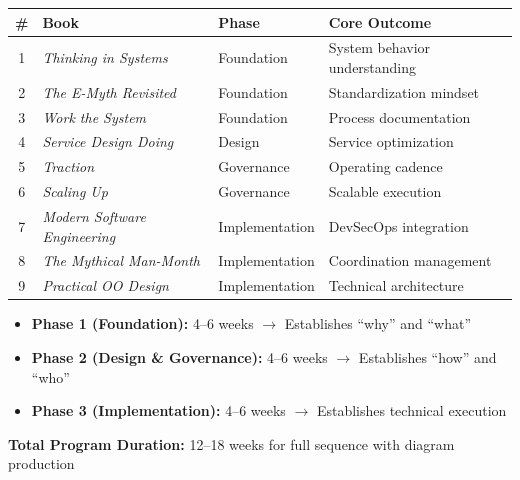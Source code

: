\documentclass[11pt,letterpaper]{article}
\newcommand{\booktitle}[1]{\textit{#1}}
\begin{document}
\begin{center}
\renewcommand{\arraystretch}{1.5}
\begin{tabular}{clll}
\toprule
\textbf{\#} & \textbf{Book} & \textbf{Phase} & \textbf{Core Outcome} \\
\midrule
1 & \booktitle{Thinking in Systems} & Foundation & System behavior understanding \\
2 & \booktitle{The E-Myth Revisited} & Foundation & Standardization mindset \\
3 & \booktitle{Work the System} & Foundation & Process documentation \\
\midrule
4 & \booktitle{Service Design Doing} & Design & Service optimization \\
5 & \booktitle{Traction} & Governance & Operating cadence \\
6 & \booktitle{Scaling Up} & Governance & Scalable execution \\
\midrule
7 & \booktitle{Modern Software Engineering} & Implementation & DevSecOps integration \\
8 & \booktitle{The Mythical Man-Month} & Implementation & Coordination management \\
9 & \booktitle{Practical OO Design} & Implementation & Technical architecture \\
\bottomrule
\end{tabular}
\end{center}

\vspace{1cm}

\begin{highlightbox}
\begin{itemize}[nosep]
    \item \textbf{Phase 1 (Foundation):} 4--6 weeks $\rightarrow$ Establishes ``why'' and ``what''
    \item \textbf{Phase 2 (Design \& Governance):} 4--6 weeks $\rightarrow$ Establishes ``how'' and ``who''
    \item \textbf{Phase 3 (Implementation):} 4--6 weeks $\rightarrow$ Establishes technical execution
\end{itemize}

\textbf{Total Program Duration:} 12--18 weeks for full sequence with diagram production
\end{highlightbox}

\newpage

\end{document}

